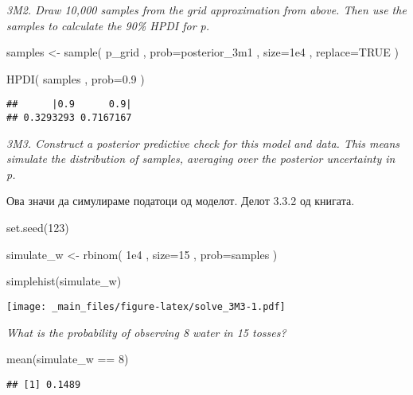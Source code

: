 \documentclass[
]{book}
\newenvironment{Shaded}{\begin{snugshade}}{\end{snugshade}}
\newcommand{\AttributeTok}[1]{\textcolor[rgb]{0.77,0.63,0.00}{#1}}
\newcommand{\ConstantTok}[1]{\textcolor[rgb]{0.00,0.00,0.00}{#1}}
\newcommand{\DecValTok}[1]{\textcolor[rgb]{0.00,0.00,0.81}{#1}}
\newcommand{\FloatTok}[1]{\textcolor[rgb]{0.00,0.00,0.81}{#1}}
\newcommand{\FunctionTok}[1]{\textcolor[rgb]{0.00,0.00,0.00}{#1}}
\newcommand{\NormalTok}[1]{#1}
\newcommand{\OtherTok}[1]{\textcolor[rgb]{0.56,0.35,0.01}{#1}}
\newcommand{\SpecialCharTok}[1]{\textcolor[rgb]{0.00,0.00,0.00}{#1}}
\begin{document}
\emph{3M2. Draw 10,000 samples from the grid approximation from above. Then use the samples to calculate the 90\% HPDI for p.}

\begin{Shaded}
\begin{Highlighting}[]
\NormalTok{samples }\OtherTok{\textless{}{-}} \FunctionTok{sample}\NormalTok{( p\_grid , }\AttributeTok{prob=}\NormalTok{posterior\_3m1 , }\AttributeTok{size=}\FloatTok{1e4}\NormalTok{ , }\AttributeTok{replace=}\ConstantTok{TRUE}\NormalTok{ )}

\FunctionTok{HPDI}\NormalTok{( samples , }\AttributeTok{prob=}\FloatTok{0.9}\NormalTok{ )}
\end{Highlighting}
\end{Shaded}

\begin{verbatim}
##      |0.9      0.9| 
## 0.3293293 0.7167167
\end{verbatim}

\emph{3M3. Construct a posterior predictive check for this model and data. This means simulate the distribution of samples, averaging over the posterior uncertainty in p.}

Ова значи да симулираме податоци од моделот. Делот 3.3.2 од книгата.

\begin{Shaded}
\begin{Highlighting}[]
\FunctionTok{set.seed}\NormalTok{(}\DecValTok{123}\NormalTok{)}

\NormalTok{simulate\_w }\OtherTok{\textless{}{-}} \FunctionTok{rbinom}\NormalTok{( }\FloatTok{1e4}\NormalTok{ , }\AttributeTok{size=}\DecValTok{15}\NormalTok{ , }\AttributeTok{prob=}\NormalTok{samples )}

\FunctionTok{simplehist}\NormalTok{(simulate\_w)}
\end{Highlighting}
\end{Shaded}

\texttt{[image: \_main\_files/figure-latex/solve\_3M3-1.pdf]}

\emph{What is the probability of observing 8 water in 15 tosses?}

\begin{Shaded}
\begin{Highlighting}[]
\FunctionTok{mean}\NormalTok{(simulate\_w }\SpecialCharTok{==} \DecValTok{8}\NormalTok{)}
\end{Highlighting}
\end{Shaded}

\begin{verbatim}
## [1] 0.1489
\end{verbatim}
\end{document}
